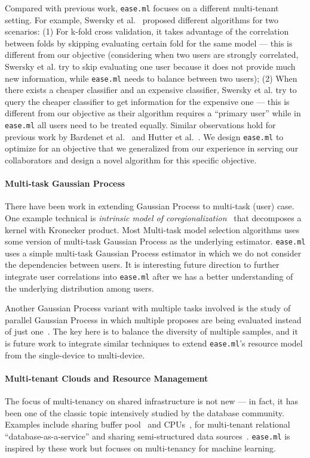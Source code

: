 \documentclass[letterpaper]{vldb}
\newcommand{\eml}{\texttt{ease.ml}\xspace}
\begin{document}
Compared with previous work, \eml focuses
on a different multi-tenant setting. For example, Swersky et al.~\cite{XXX}
proposed different algorithms for two scenarios: (1) For
k-fold cross validation, it takes advantage of the correlation between
folds by skipping evaluating certain fold for the same model --- this
is different from our objective (considering when
two users are strongly correlated, Swersky et al. try to 
skip evaluating one user because it does not provide much new 
information, while \eml needs to balance between two users); (2)
When there exists a cheaper classifier and an expensive classifier, Swersky et al.
try to query the cheaper classifier to get information
for the expensive one --- this is different from our objective
as their algorithm requires a ``primary user'' while in \eml
all users need to be treated equally. Similar observations
hold for previous work by Bardenet et al.~\cite{XXX} and Hutter et al.~\cite{XXX}.
We design \eml to optimize for an objective
that we generalized from our experience in serving our collaborators
and design a novel algorithm for this specific objective. 

\vspace{-1em}
\paragraph*{Multi-task Gaussian Process}
There have been work in extending Gaussian Process to 
multi-task (user) case. One example technical is {\em intrinsic model
of coregionalization}~\cite{XXX} that decomposes
a kernel with Kronecker product. Most 
Multi-task model selection algorithms uses some version of
multi-task Gaussian Process as the underlying estimator.
\eml uses a simple multi-task Gaussian Process estimator in which we
do not consider the dependencies between users. It is interesting
future direction to further integrate user correlations 
into \eml after we has a better understanding of the underlying
distribution among users.

Another Gaussian Process variant with multiple tasks involved
is the study of parallel Gaussian Process in which multiple
proposes are being evaluated instead of just one~\cite{XXX}.
The key here is to balance the diversity of multiple samples,
and it is future work to integrate similar techniques
to extend \eml's resource model from the single-device to multi-device.

\vspace{-1em}
\paragraph*{Multi-tenant Clouds and Resource Management}
The focus of multi-tenancy on shared infrastructure is not new ---
in fact, it has been one of the classic topic intensively
studied by the database community. Examples include
sharing buffer pool~\cite{XXX} and CPUs~\cite{XXX},
for multi-tenant relational ``database-as-a-service''
and sharing semi-structured data sources~\cite{XXX}.
\eml is inspired by these work but focuses on
multi-tenancy for machine learning.
\end{document}
